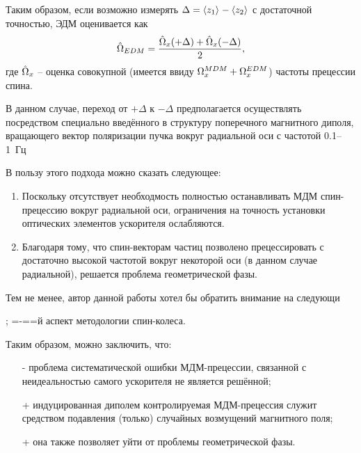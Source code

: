 Таким образом, если возможно измерять $\Delta = \avg{z_1} - \avg{z_2}$ с достаточной точностью, 
ЭДМ оценивается как
\begin{equation}\label{eq:SW:EDM-estimator}
	\hat{\Omega}_{EDM} = \frac{\hat{\Omega}_x(+\Delta) + \hat{\Omega}_x(-\Delta)}{2},
\end{equation}
где $\hat{\Omega}_x$ -- оценка совокупной (имеется ввиду $\Omega_x^{MDM} + \Omega_x^{EDM}$) частоты прецессии спина.

В данном случае, переход от $+\Delta$ к $-\Delta$ предполагается осуществлять посредством специально введённого
в структуру поперечного магнитного диполя, вращающего вектор поляризации пучка вокруг радиальной оси
с частотой 0.1--1~Гц~\cite[стр.~4]{Koop:SpinWheel2015} 

В пользу этого подхода можно сказать следующее:
\begin{enumerate}[(1)]
	\item Поскольку отсутствует необходмость полностью останавливать МДМ спин-прецессию вокруг радиальной оси, ограничения на точность установки оптических элементов ускорителя ослабляются.
	\item Благодаря тому, что спин-векторам частиц позволено прецессировать с достаточно высокой частотой вокруг некоторой оси (в данном случае радиальной), решается проблема геометрической фазы.
\end{enumerate}

Тем не менее, автор данной работы хотел бы обратить внимание на следующи


;
=-==й аспект методологии спин-колеса.

Таким образом, можно заключить, что:
\begin{itemize}
	\item[-] проблема систематической ошибки МДМ-прецессии, связанной с неидеальностью самого ускорителя 
	не является решённой;
	\item[+] индуцированная диполем контролируемая МДМ-прецессия служит средством подавления (только)
	случайных возмущений магнитного поля;
	\item[+] она также позволяет уйти от проблемы геометрической фазы.
\end{itemize}

